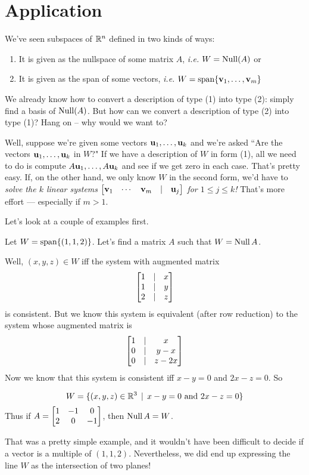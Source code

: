 \section{Application}
\label{section:subspacedescription}


We've seen subspaces of $\mathbb{R}^n$ defined in two kinds of ways: 

\begin{enumerate}
\item It is given as the nullspace of some matrix $A$, \emph{i.e.} $W=\operatorname{Null}(A)$ or
\item It is given as the span of some vectors, \emph{i.e.} $W=\textrm{span}\{\mathbf{v}_1, \dots, \mathbf{v}_m\}$
\end{enumerate}
 We already know how to convert a description of type (1) into type (2): simply find a basis of $\operatorname{Null}(A)$. But how can we convert a description of type (2) into type (1)? 
Hang on -- why would we want to? 

Well, suppose we're given some vectors $ \mathbf{u}_1,\dots,\mathbf{u}_k $ and we're asked ``Are the vectors $\mathbf{u}_1,\dots,\mathbf{u}_k$ in $W$?" If we have a description of $W$ in form (1), all we need to do is compute $A\mathbf{u}_1, \dots, A\mathbf{u}_k$ and see if we get zero in each case. That's pretty easy. If, on the other hand, we only know $W$ in the second form, we'd have to {\it solve the $k$ linear systems $\left[ \begin{matrix} \mathbf{v}_1&\cdots&  \mathbf{v}_m &|& \mathbf{u}_j \end{matrix} \right]$ for $1\le j\le k$!} That's  more effort --- especially if $m>1$.




Let's look at a couple of examples first.

\begin{myexample}
Let $W=\textrm{span}\{(1,1,2)\}$. Let's find a matrix $A$ such that $W=\operatorname{Null} A$.

Well, $(x,y,z)\in W$ iff the system with augmented matrix
$$\left[ \begin{matrix} 1&|&x\\1&|&y\\2&|&z \end{matrix} \right]$$ is consistent. But we know this system is equivalent (after row reduction) to the system whose augmented matrix is 
$$\left[ \begin{matrix} 1&|&x\\0&|&y-x\\0&|&z-2x \end{matrix} \right]$$Now we know that this system is consistent iff $x-y=0$ and $2x-z=0$. So

$$W=\{(x,y,z) \in \mathbb{R}^3 \,\mid \, x-y=0\text{ and }2x-z=0  \}$$ Thus if $A=\left[ \begin{matrix} 1&-1&0\\2&0&-1 \end{matrix} \right]$, then $\operatorname{Null} A= W$.
\end{myexample}

That was a pretty simple example, and it wouldn't have been difficult to decide if a vector is a multiple of $(1,1,2)$. Nevertheless, we did end up expressing the line $W$ as the intersection of two planes! 

